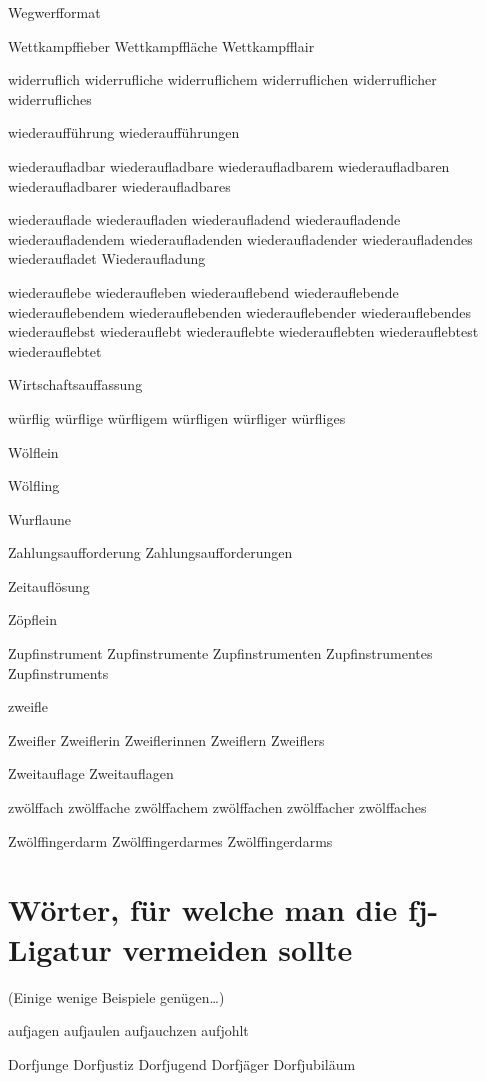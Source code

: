 Wegwerfformat

Wettkampffieber Wettkampffläche Wettkampfflair 

widerruflich widerrufliche widerruflichem widerruflichen widerruflicher widerrufliches

wiederaufführung wiederaufführungen

wiederaufladbar wiederaufladbare wiederaufladbarem wiederaufladbaren wiederaufladbarer wiederaufladbares 

wiederauflade wiederaufladen wiederaufladend wiederaufladende wiederaufladendem wiederaufladenden wiederaufladender wiederaufladendes wiederaufladet Wiederaufladung

wiederauflebe wiederaufleben wiederauflebend wiederauflebende wiederauflebendem wiederauflebenden wiederauflebender wiederauflebendes wiederauflebst wiederauflebt wiederauflebte wiederauflebten wiederauflebtest wiederauflebtet

Wirtschaftsauffassung


würflig würflige würfligem würfligen würfliger würfliges

Wölflein

Wölfling

Wurflaune

Zahlungsaufforderung Zahlungsaufforderungen

Zeitauflösung

Zöpflein

Zupfinstrument Zupfinstrumente Zupfinstrumenten Zupfinstrumentes Zupfinstruments

zweifle 

Zweifler Zweiflerin Zweiflerinnen Zweiflern Zweiflers

Zweitauflage Zweitauflagen

zwölffach zwölffache zwölffachem zwölffachen zwölffacher zwölffaches

Zwölffingerdarm Zwölffingerdarmes Zwölffingerdarms
  


\section*{Wörter, für welche man die \mbox{fj}-Ligatur vermeiden sollte}

(Einige wenige Beispiele genügen\ldots)

\bgroup \gbp %
aufjagen aufjaulen aufjauchzen aufjohlt

Dorfjunge Dorfjustiz Dorfjugend Dorfjäger Dorfjubiläum

